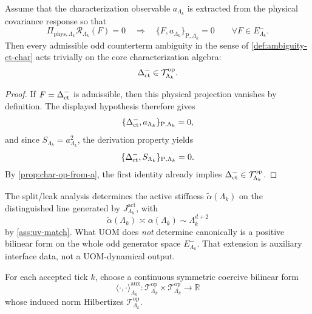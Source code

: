 \documentclass[11pt]{article}
\begin{document}
\begin{proposition}
\label{prop:ambiguity-ct-char}
Assume that the characterization observable \(a_{\Lambda_k}\) is extracted from the physical
covariance response so that
\[
\Pi_{\mathrm{phys},\Lambda_k}\mathcal R_{\Lambda_k}(F)=0
\quad\Longrightarrow\quad
\{F,a_{\Lambda_k}\}_{\mathrm P,\Lambda_k}=0
\qquad
\forall F\in E^-_{\Lambda_k}.
\]
Then every admissible odd counterterm ambiguity in the sense of \cref{def:ambiguity-ct-char} acts
trivially on the core characterization algebra:
\[
\Delta_{\rm ct}^{-}\in \mathcal T^{\mathrm{op}}_{\Lambda_k}.
\]
\end{proposition}

\begin{proof}
If \(F=\Delta_{\rm ct}^{-}\) is admissible, then this physical projection vanishes by definition.
The displayed hypothesis therefore gives
\[
\{\Delta_{\rm ct}^{-},a_{\Lambda_k}\}_{\mathrm P,\Lambda_k}=0,
\]
and since \(S_{\Lambda_k}=a_{\Lambda_k}^2\), the derivation property yields
\[
\{\Delta_{\rm ct}^{-},S_{\Lambda_k}\}_{\mathrm P,\Lambda_k}=0.
\]
By \cref{prop:char-op-from-a}, the first identity already implies
\(\Delta_{\rm ct}^{-}\in\mathcal T^{\mathrm{op}}_{\Lambda_k}\).
\end{proof}

\begin{remark}
\label{rem:char-calibration-split}
The split/leak analysis determines the active stiffness \(\widetilde\alpha(\Lambda_k)\) on the
distinguished line generated by \(J^{\mathrm{act}}_{\Lambda_k}\), with
\[
\widetilde\alpha(\Lambda_k)\asymp \alpha(\Lambda_k)\sim \Lambda_k^{d+2}
\]
by \cref{ass:uv-match}. What UOM does \emph{not} determine canonically is a positive bilinear form
on the whole odd generator space \(E^-_{\Lambda_k}\). That extension is auxiliary interface data,
not a UOM-dynamical output.
\end{remark}

\begin{assumption}
\label{ass:aux-char-core}
For each accepted tick \(k\), choose a continuous symmetric coercive bilinear form
\[
\langle\cdot,\cdot\rangle^{\mathrm{aux}}_{\Lambda_k}
:
\mathcal T^{\mathrm{op}}_{\Lambda_k}\times \mathcal T^{\mathrm{op}}_{\Lambda_k}\to\mathbb R
\]
whose induced norm Hilbertizes \(\mathcal T^{\mathrm{op}}_{\Lambda_k}\).
\end{assumption}
\end{document}

